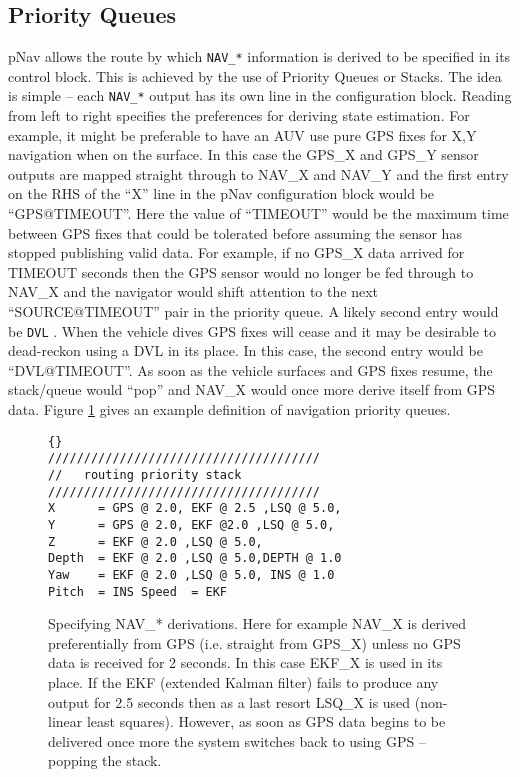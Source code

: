 \documentclass[a4paper,10pt]{article}
\newcommand{\Code}[1]{\texttt{#1} }
\newcommand{\code}[1]{\Code{#1} }
\begin{document}
\subsection{Priority Queues}
pNav allows the route by which \code{NAV\_*} information is
derived to be specified in its control block. This is achieved by
the use of Priority Queues or Stacks. The idea is simple -- each
\code{NAV\_*} output has its own line in the configuration block.
Reading from left to right specifies the preferences for deriving
state estimation. For example, it might be preferable to have an
AUV use pure GPS fixes for X,Y navigation when on the surface. In
this case the GPS\_X and GPS\_Y sensor outputs are mapped straight
through to NAV\_X and NAV\_Y and the first entry on the RHS of the ``X'' line
in the pNav configuration block would be ``GPS@TIMEOUT''. Here the
value of ``TIMEOUT'' would be the maximum time between GPS fixes
that could be tolerated before assuming the sensor has stopped
publishing valid data. For example, if no GPS\_X data arrived for
TIMEOUT seconds then the GPS sensor would no longer be fed through
to NAV\_X and the navigator would shift attention to the next
``SOURCE@TIMEOUT'' pair in the priority queue. A likely second
entry would be \code{DVL}. When the vehicle dives GPS fixes will
cease and it may be desirable to dead-reckon using a DVL in its
place. In this case, the second entry would be ``DVL@TIMEOUT''. As
soon as the vehicle surfaces and GPS fixes resume, the stack/queue
would ``pop'' and NAV\_X would once more derive itself from GPS
data. Figure \ref{fig:PriorityQueues} gives an example definition
of navigation priority queues.
\begin{figure}\label{fig:PriorityQueues}
\begin{lstlisting}[]{}
//////////////////////////////////////
//   routing priority stack
//////////////////////////////////////
X      = GPS @ 2.0, EKF @ 2.5 ,LSQ @ 5.0,
Y      = GPS @ 2.0, EKF @2.0 ,LSQ @ 5.0,
Z      = EKF @ 2.0 ,LSQ @ 5.0,
Depth  = EKF @ 2.0 ,LSQ @ 5.0,DEPTH @ 1.0
Yaw    = EKF @ 2.0 ,LSQ @ 5.0, INS @ 1.0
Pitch  = INS Speed  = EKF
\end{lstlisting}
\caption{Specifying NAV\_* derivations. Here for example NAV\_X is
derived preferentially from GPS (i.e. straight from GPS\_X) unless
no GPS data is received for 2 seconds. In this case EKF\_X is used
in its place. If the EKF (extended Kalman filter) fails to produce
any output for 2.5 seconds then as a last resort LSQ\_X is used
(non-linear least squares). However, as soon as GPS data begins to
be delivered once more the system switches back to using GPS
-- popping the stack.}
\end{figure}
\end{document}
